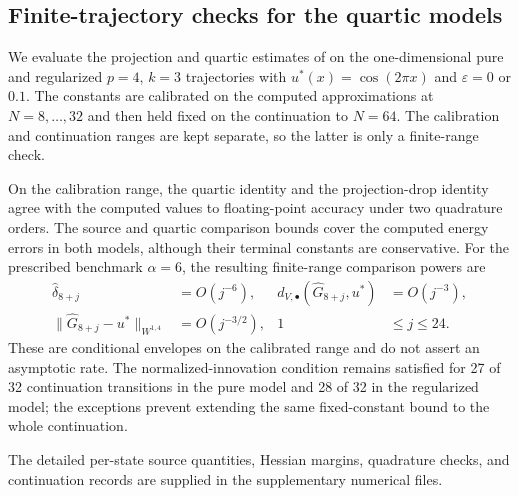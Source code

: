 \subsection{Finite-trajectory checks for the quartic models}
\label{sec:finite-trajectory-numerics}
\label{sec:fractional-innovation-p4}

We evaluate the projection and quartic estimates of  on the
one-dimensional pure and regularized $p=4$, $k=3$ trajectories with
$u^*(x)=\cos(2\pi x)$ and $\varepsilon=0$ or $0.1$. The constants are
calibrated on the computed approximations at $N=8,\ldots,32$ and then held fixed on the
continuation to $N=64$. The calibration and continuation ranges are kept
separate, so the latter is only a finite-range check.

On the calibration range, the quartic identity and the projection-drop
identity agree with the computed values to floating-point accuracy under two
quadrature orders. The source and quartic comparison bounds cover the
computed energy errors in both models, although their terminal constants are
conservative. For the prescribed benchmark $\alpha=6$, the resulting
finite-range comparison powers are
\begin{align*}
 \widehat\delta_{8+j}&=O(j^{-6}),&
 d_{V,\bullet}(\widehat G_{8+j},u^*)&=O(j^{-3}),\\
 \|\widehat G_{8+j}-u^*\|_{W^{1,4}}&=O(j^{-3/2}),&
 1&\le j\le24.
\end{align*}
These are conditional envelopes on the calibrated range and do not assert an
asymptotic rate. The normalized-innovation condition remains satisfied for
27 of 32 continuation transitions in the pure model and 28 of 32 in the
regularized model; the exceptions prevent extending the same fixed-constant
bound to the whole continuation.

The detailed per-state source quantities, Hessian margins, quadrature checks,
and continuation records are supplied in the supplementary numerical files.
